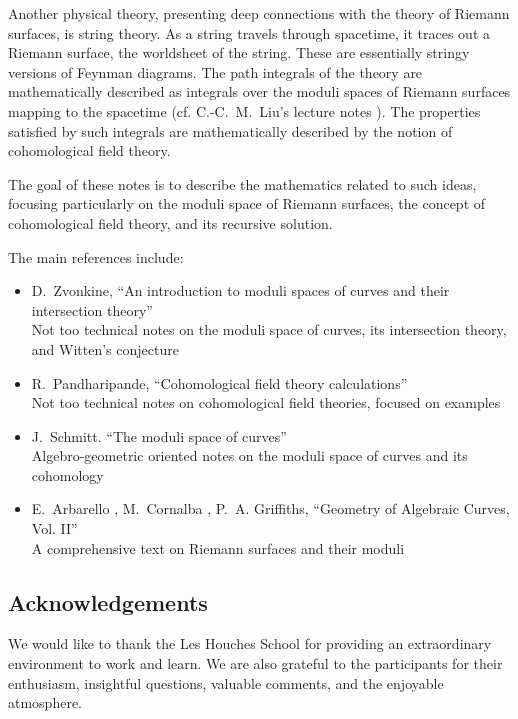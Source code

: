 \documentclass[11pt,reqno]{amsart}
\numberwithin{equation}{section}
\theoremstyle{plain}
\theoremstyle{definition}
\begin{document}
Another physical theory, presenting deep connections with the theory of Riemann surfaces, is string theory. As a string travels through spacetime, it traces out a Riemann surface, the worldsheet of the string. These are essentially stringy versions of Feynman diagrams. The path integrals of the theory are mathematically described as integrals over the moduli spaces of Riemann surfaces mapping to the spacetime (cf. C.-C.~M.~Liu's lecture notes \cite{Liu}). The properties satisfied by such integrals are mathematically described by the notion of cohomological field theory.

The goal of these notes is to describe the mathematics related to such ideas, focusing particularly on the moduli space of Riemann surfaces, the concept of cohomological field theory, and its recursive solution.

The main references include:
\begin{itemize}[leftmargin=1.6cm,itemsep=.75em]
  \item[{\cite{Zvo12}}] D.~Zvonkine, ``An introduction to moduli spaces of curves and their intersection theory''
  \\
  {\footnotesize Not too technical notes on the moduli space of curves, its intersection theory, and Witten's conjecture}

  \item[{\cite{Pan19}}] R.~Pandharipande, ``Cohomological field theory calculations''
  \\
  {\footnotesize Not too technical notes on cohomological field theories, focused on examples}

  \item[{\cite{Sch20}}] J.~Schmitt. ``The moduli space of curves''
  \\
  {\footnotesize Algebro-geometric oriented notes on the moduli space of curves and its cohomology}

  \item[{\cite{ACG11}}]  E.~Arbarello , M.~Cornalba , P.~A. Griffiths, ``Geometry of Algebraic Curves, Vol. II''%
  \\
  {\footnotesize A comprehensive text on Riemann surfaces and their moduli}
\end{itemize}

\subsection*{Acknowledgements}
We would like to thank the Les Houches School for providing an extraordinary environment to work and learn. We are also grateful to the participants for their enthusiasm, insightful questions, valuable comments, and the enjoyable atmosphere.
\end{document}
